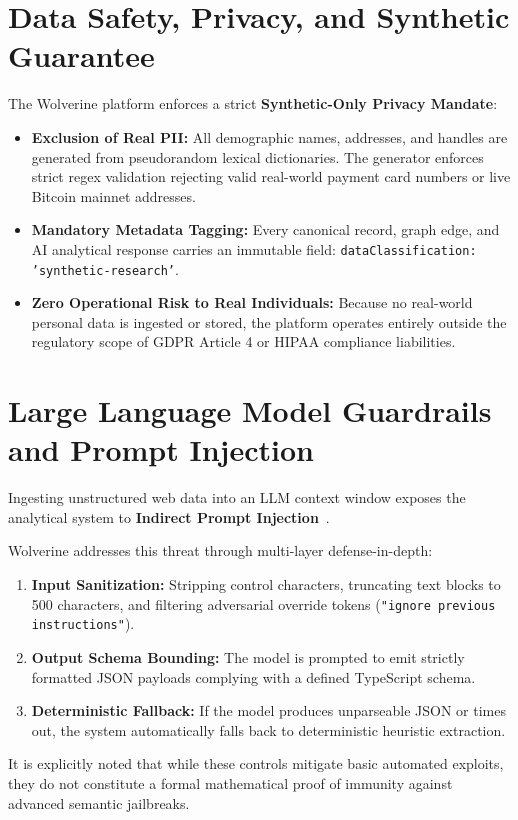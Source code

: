 \section{Data Safety, Privacy, and Synthetic Guarantee}
\label{sec:sec-data-safety}
The Wolverine platform enforces a strict \textbf{Synthetic-Only Privacy Mandate}:
\begin{itemize}
    \item \textbf{Exclusion of Real PII:} All demographic names, addresses, and handles are generated from pseudorandom lexical dictionaries. The generator enforces strict regex validation rejecting valid real-world payment card numbers or live Bitcoin mainnet addresses.
    \item \textbf{Mandatory Metadata Tagging:} Every canonical record, graph edge, and AI analytical response carries an immutable field: \texttt{dataClassification: 'synthetic-research'}.
    \item \textbf{Zero Operational Risk to Real Individuals:} Because no real-world personal data is ingested or stored, the platform operates entirely outside the regulatory scope of GDPR Article 4 or HIPAA compliance liabilities.
\end{itemize}

\section{Large Language Model Guardrails and Prompt Injection}
\label{sec:sec-llm-security}
Ingesting unstructured web data into an LLM context window exposes the analytical system to \textbf{Indirect Prompt Injection}~\cite{perez2022ignore}. 

Wolverine addresses this threat through multi-layer defense-in-depth:
\begin{enumerate}
    \item \textbf{Input Sanitization:} Stripping control characters, truncating text blocks to 500 characters, and filtering adversarial override tokens (\texttt{"ignore previous instructions"}).
    \item \textbf{Output Schema Bounding:} The model is prompted to emit strictly formatted JSON payloads complying with a defined TypeScript schema.
    \item \textbf{Deterministic Fallback:} If the model produces unparseable JSON or times out, the system automatically falls back to deterministic heuristic extraction.
\end{enumerate}
It is explicitly noted that while these controls mitigate basic automated exploits, they do not constitute a formal mathematical proof of immunity against advanced semantic jailbreaks.

